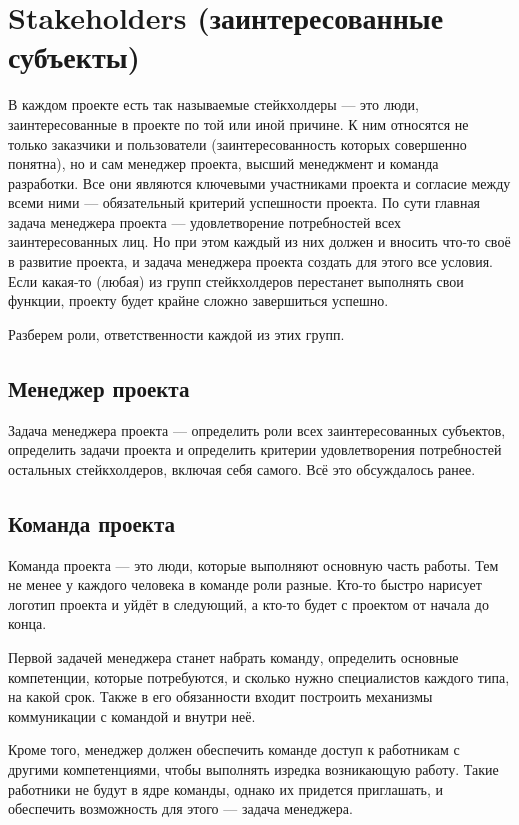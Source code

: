 \documentclass{../../text-style}
\begin{document}
\section{Stakeholders (заинтересованные субъекты)}

В каждом проекте есть так называемые стейкхолдеры --- это люди, заинтересованные в проекте по той или иной причине. К ним относятся не только заказчики и пользователи (заинтересованность которых совершенно понятна), но и сам менеджер проекта, высший менеджмент и команда разработки. Все они являются ключевыми участниками проекта и согласие между всеми ними --- обязательный критерий успешности проекта. По сути главная задача менеджера проекта --- удовлетворение потребностей всех заинтересованных лиц. Но при этом каждый из них должен и вносить что-то своё в развитие проекта, и задача менеджера проекта создать для этого все условия. Если какая-то (любая) из групп стейкхолдеров перестанет выполнять свои функции, проекту будет крайне сложно завершиться успешно.

Разберем роли, ответственности каждой из этих групп.

\subsection{Менеджер проекта}

Задача менеджера проекта --- определить роли всех заинтересованных субъектов, определить задачи проекта и определить критерии удовлетворения потребностей остальных стейкхолдеров, включая себя самого. Всё это обсуждалось ранее. 

\subsection{Команда проекта}

Команда проекта --- это люди, которые выполняют основную часть работы. Тем не менее у каждого человека в команде роли разные. Кто-то быстро нарисует логотип проекта и уйдёт в следующий, а кто-то будет с проектом от начала до конца.

Первой задачей менеджера станет набрать команду, определить основные компетенции, которые потребуются, и сколько нужно специалистов каждого типа, на какой срок. Также в его обязанности входит построить механизмы коммуникации с командой и внутри неё.

Кроме того, менеджер должен обеспечить команде доступ к работникам с другими компетенциями, чтобы выполнять изредка возникающую работу. Такие работники не будут в ядре команды, однако их придется приглашать, и обеспечить возможность для этого --- задача менеджера.
\end{document}
